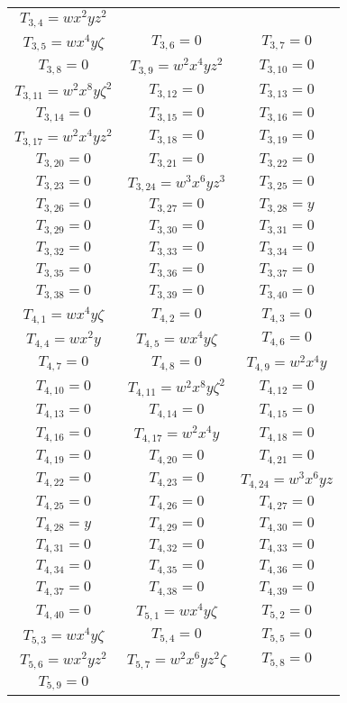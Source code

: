 \documentclass[12pt]{memoireuqam1.3}
\begin{document}
\begin{longtable}{|c|c|c|}
$T_{3,4}= wx^2yz^2$\\
$T_{3,5}= wx^4y\zeta$&
$T_{3,6}= 0$&
$T_{3,7}= 0$\\
$T_{3,8}= 0$&
$T_{3,9}= w^2x^4yz^2$&
$T_{3,10}= 0$\\
$T_{3,11}= w^2x^8y\zeta^2$&
$T_{3,12}= 0$&
$T_{3,13}= 0$\\
$T_{3,14}= 0$&
$T_{3,15}= 0$&
$T_{3,16}= 0$\\
$T_{3,17}= w^2x^4yz^2$&
$T_{3,18}= 0$&
$T_{3,19}= 0$\\
$T_{3,20}= 0$&
$T_{3,21}= 0$&
$T_{3,22}= 0$\\
$T_{3,23}= 0$&
$T_{3,24}= w^3x^6yz^3$&
$T_{3,25}= 0$\\
$T_{3,26}= 0$&
$T_{3,27}= 0$&
$T_{3,28}= y$\\
$T_{3,29}= 0$&
$T_{3,30}= 0$&
$T_{3,31}= 0$\\
$T_{3,32}= 0$&
$T_{3,33}= 0$&
$T_{3,34}= 0$\\
$T_{3,35}= 0$&
$T_{3,36}= 0$&
$T_{3,37}= 0$\\
$T_{3,38}= 0$&
$T_{3,39}= 0$&
$T_{3,40}= 0$\\
$T_{4,1}= wx^4y\zeta$&
$T_{4,2}= 0$&
$T_{4,3}= 0$\\
$T_{4,4}= wx^2y$&
$T_{4,5}= wx^4y\zeta$&
$T_{4,6}= 0$\\
$T_{4,7}= 0$&
$T_{4,8}= 0$&
$T_{4,9}= w^2x^4y$\\
$T_{4,10}= 0$&
$T_{4,11}= w^2x^8y\zeta^2$&
$T_{4,12}= 0$\\
$T_{4,13}= 0$&
$T_{4,14}= 0$&
$T_{4,15}= 0$\\
$T_{4,16}= 0$&
$T_{4,17}= w^2x^4y$&
$T_{4,18}= 0$\\
$T_{4,19}= 0$&
$T_{4,20}= 0$&
$T_{4,21}= 0$\\
$T_{4,22}= 0$&
$T_{4,23}= 0$&
$T_{4,24}= w^3x^6yz$\\
$T_{4,25}= 0$&
$T_{4,26}= 0$&
$T_{4,27}= 0$\\
$T_{4,28}= y$&
$T_{4,29}= 0$&
$T_{4,30}= 0$\\
$T_{4,31}= 0$&
$T_{4,32}= 0$&
$T_{4,33}= 0$\\
$T_{4,34}= 0$&
$T_{4,35}= 0$&
$T_{4,36}= 0$\\
$T_{4,37}= 0$&
$T_{4,38}= 0$&
$T_{4,39}= 0$\\
$T_{4,40}= 0$&
$T_{5,1}= wx^4y\zeta$&
$T_{5,2}= 0$\\
$T_{5,3}= wx^4y\zeta$&
$T_{5,4}= 0$&
$T_{5,5}= 0$\\
$T_{5,6}= wx^2yz^2$&
$T_{5,7}= w^2x^6yz^2\zeta$&
$T_{5,8}= 0$\\
$T_{5,9}= 0$&

\end{longtable}
\end{document}
